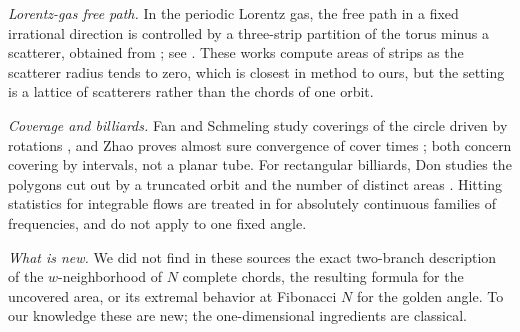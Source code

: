 \emph{Lorentz-gas free path.} In the periodic Lorentz gas, the free path in a fixed irrational
direction is controlled by a three-strip partition of the torus minus a scatterer, obtained from
\cite{BK93}; see \cite{MS03,BZ07}. These works compute areas of strips as the scatterer radius
tends to zero, which is closest in method to ours, but the setting is a lattice of scatterers
rather than the chords of one orbit.

\emph{Coverage and billiards.} Fan and Schmeling study coverings of the circle driven by
rotations \cite{FS02}, and Zhao proves almost sure convergence of cover times
\cite{Zhao25}; both concern covering by intervals, not a planar tube. For rectangular billiards,
Don studies the polygons cut out by a truncated orbit and the number of distinct areas
\cite{Don12}. Hitting statistics for integrable flows are treated in \cite{DMS17} for
absolutely continuous families of frequencies, and do not apply to one fixed angle.

\emph{What is new.} We did not find in these sources the exact two-branch description of the
$w$-neighborhood of $N$ complete chords, the resulting formula for the uncovered area, or its
extremal behavior at Fibonacci $N$ for the golden angle. To our knowledge these are new;
the one-dimensional ingredients are classical.

